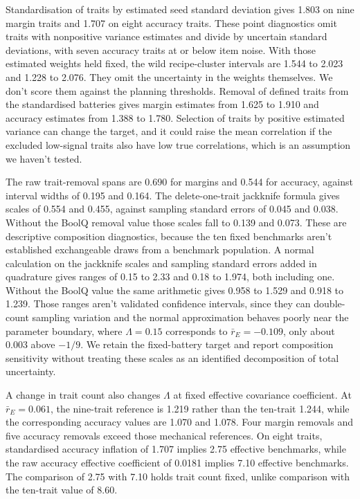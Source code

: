Standardisation of traits by estimated seed standard deviation gives 1.803 on nine margin traits and 1.707 on eight accuracy traits. These point diagnostics omit traits with nonpositive variance estimates and divide by uncertain standard deviations, with seven accuracy traits at or below item noise. With those estimated weights held fixed, the wild recipe-cluster intervals are 1.544 to 2.023 and 1.228 to 2.076. They omit the uncertainty in the weights themselves. We don't score them against the planning thresholds. Removal of defined traits from the standardised batteries gives margin estimates from 1.625 to 1.910 and accuracy estimates from 1.388 to 1.780. Selection of traits by positive estimated variance can change the target, and it could raise the mean correlation if the excluded low-signal traits also have low true correlations, which is an assumption we haven't tested.

The raw trait-removal spans are 0.690 for margins and 0.544 for accuracy, against interval widths of 0.195 and 0.164. The delete-one-trait jackknife formula gives scales of 0.554 and 0.455, against sampling standard errors of 0.045 and 0.038. Without the BoolQ removal value those scales fall to 0.139 and 0.073. These are descriptive composition diagnostics, because the ten fixed benchmarks aren't established exchangeable draws from a benchmark population. A normal calculation on the jackknife scales and sampling standard errors added in quadrature gives ranges of 0.15 to 2.33 and 0.18 to 1.974, both including one. Without the BoolQ value the same arithmetic gives 0.958 to 1.529 and 0.918 to 1.239. Those ranges aren't validated confidence intervals, since they can double-count sampling variation and the normal approximation behaves poorly near the parameter boundary, where $\Lambda=0.15$ corresponds to $\bar r_E=-0.109$, only about 0.003 above $-1/9$. We retain the fixed-battery target and report composition sensitivity without treating these scales as an identified decomposition of total uncertainty.

A change in trait count also changes $\Lambda$ at fixed effective covariance coefficient. At $\bar r_E=0.061$, the nine-trait reference is 1.219 rather than the ten-trait 1.244, while the corresponding accuracy values are 1.070 and 1.078. Four margin removals and five accuracy removals exceed those mechanical references. On eight traits, standardised accuracy inflation of 1.707 implies 2.75 effective benchmarks, while the raw accuracy effective coefficient of 0.0181 implies 7.10 effective benchmarks. The comparison of 2.75 with 7.10 holds trait count fixed, unlike comparison with the ten-trait value of 8.60.

